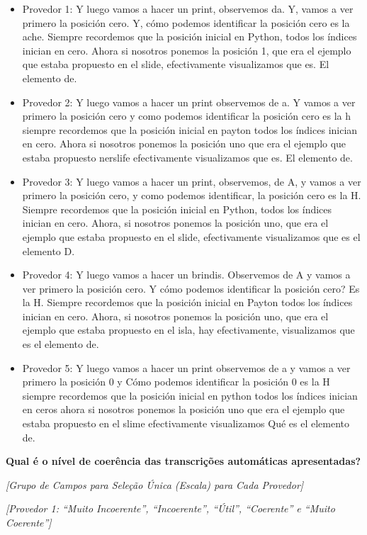 \begin{itemize}
    \item Provedor 1: Y luego vamos a hacer un print, observemos da. Y, vamos a ver primero la posición cero. Y, cómo podemos identificar la posición cero es la ache. Siempre recordemos que la posición inicial en Python, todos los índices inician en cero. Ahora si nosotros ponemos la posición 1, que era el ejemplo que estaba propuesto en el slide, efectivamente visualizamos que es. El elemento de.
    \item Provedor 2: Y luego vamos a hacer un print observemos de a. Y vamos a ver primero la posición cero y como podemos identificar la posición cero es la h siempre recordemos que la posición inicial en payton todos los índices inician en cero. Ahora si nosotros ponemos la posición uno que era el ejemplo que estaba propuesto nerslife efectivamente visualizamos que es. El elemento de.
    \item Provedor 3: Y luego vamos a hacer un print, observemos, de A, y vamos a ver primero la posición cero, y como podemos identificar, la posición cero es la H. Siempre recordemos que la posición inicial en Python, todos los índices inician en cero. Ahora, si nosotros ponemos la posición uno, que era el ejemplo que estaba propuesto en el slide, efectivamente visualizamos que es el elemento D.
    \item Provedor 4: Y luego vamos a hacer un brindis. Observemos de A y vamos a ver primero la posición cero. Y cómo podemos identificar la posición cero? Es la H. Siempre recordemos que la posición inicial en Payton todos los índices inician en cero. Ahora, si nosotros ponemos la posición uno, que era el ejemplo que estaba propuesto en el isla, hay efectivamente, visualizamos que es el elemento de.
    \item Provedor 5: Y luego vamos a hacer un print observemos de a y vamos a ver primero la posición 0 y Cómo podemos identificar la posición 0 es la H siempre recordemos que la posición inicial en python todos los índices inician en ceros ahora si nosotros ponemos la posición uno que era el ejemplo que estaba propuesto en el slime efectivamente visualizamos Qué es el elemento de.
\end{itemize}

\noindent
\textbf{Qual é o nível de coerência das transcrições automáticas apresentadas?}

\noindent
\textit{[Grupo de Campos para Seleção Única (Escala) para Cada Provedor]}

\noindent
\textit{[Provedor 1: ``Muito Incoerente'', ``Incoerente'', ``Útil'', ``Coerente'' e ``Muito Coerente'']}

